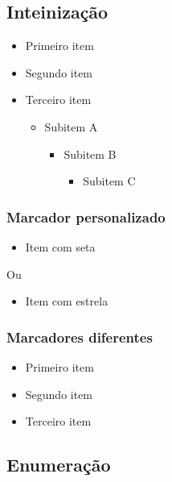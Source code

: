 \documentclass[twoside]{article}
\begin{document}
	\subsection{Inteinização}
	
	\begin{itemize}
		\item Primeiro item
		\item Segundo item
		\item Terceiro item
		\begin{itemize}
			\item Subitem A
			\begin{itemize}
				\item Subitem B
				\begin{itemize}
					\item Subitem C
				\end{itemize}
			\end{itemize}
		\end{itemize}
	\end{itemize}
	
	\subsubsection{Marcador personalizado}
	
	\begin{itemize}[label=→]
		\item Item com seta
	\end{itemize}
	
	Ou
	
	\begin{itemize}[label=]
		\item Item com estrela
	\end{itemize}

	\subsubsection{Marcadores diferentes}
	
		\begin{itemize}
			\item[] Primeiro item
			\item[La] Segundo item
			\item[TeX´] Terceiro item
		\end{itemize}
	
	\subsection{Enumeração}
	
\end{document}
